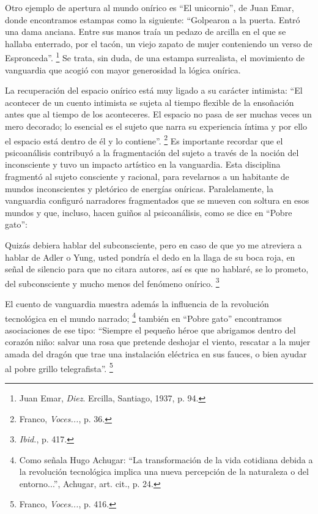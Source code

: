 \documentclass[14pt,twoside,final]{extbook} %
\let\oldfootnote\footnote
\renewcommand\footnote[1]{%
\oldfootnote{\hspace{1mm}#1}}
\begin{document}
Otro ejemplo de apertura al mundo onírico es ``El unicornio'', de Juan Emar, donde encontramos estampas como la siguiente: ``Golpearon a la puerta. Entró una dama anciana. Entre sus manos traía un pedazo de arcilla en el que se hallaba enterrado, por el tacón, un viejo zapato de mujer conteniendo un verso de Espronceda''.\footnote{Juan Emar, \emph{Diez}. Ercilla, Santiago, 1937, p. 94.} Se trata, sin duda, de una estampa surrealista, el movimiento de vanguardia que acogió con mayor generosidad la lógica onírica.

La recuperación del espacio onírico está muy ligado a su carácter intimista: ``El acontecer de un cuento intimista se sujeta al tiempo flexible de la ensoñación antes que al tiempo de los aconteceres. El espacio no pasa de ser muchas veces un mero decorado; lo esencial es el sujeto que narra su experiencia íntima y por ello el espacio está dentro de él y lo contiene''.\footnote{Franco, \emph{Voces...}, p. 36.} Es importante recordar que el psicoanálisis contribuyó a la fragmentación del sujeto a través de la noción del inconsciente y tuvo un impacto artístico en la vanguardia. Esta disciplina fragmentó al sujeto consciente y racional, para revelarnos a un habitante de mundos inconscientes y pletórico de energías oníricas. Paralelamente, la vanguardia configuró narradores fragmentados que se mueven con soltura en esos mundos y que, incluso, hacen guiños al psicoanálisis, como se dice en ``Pobre gato'':
\begin{quoting}
Quizás debiera hablar del subconsciente, pero en caso de que yo me atreviera a hablar de Adler o Yung, usted pondría el dedo en la llaga de su boca roja, en señal de silencio para que no citara autores, así es que no hablaré, se lo prometo, del subconsciente y mucho menos del fenómeno onírico.\footnote{\emph{Ibid.}, p. 417.}
\end{quoting}
El cuento de vanguardia muestra además la influencia de la revolución tecnológica en el mundo narrado;\footnote{Como señala Hugo Achugar: ``La transformación de la vida cotidiana debida a la
revolución tecnológica implica una nueva percepción de la naturaleza o del entorno...'', Achugar, art. cit., p. 24.} también en ``Pobre gato'' encontramos asociaciones de ese tipo: ``Siempre el pequeño héroe que abrigamos dentro del corazón niño: salvar una rosa que pretende deshojar el viento, rescatar a la mujer amada del dragón que trae una instalación eléctrica en sus fauces, o bien ayudar al pobre grillo telegrafista''.\footnote{Franco, \emph{Voces...}, p. 416.}
\end{document}
